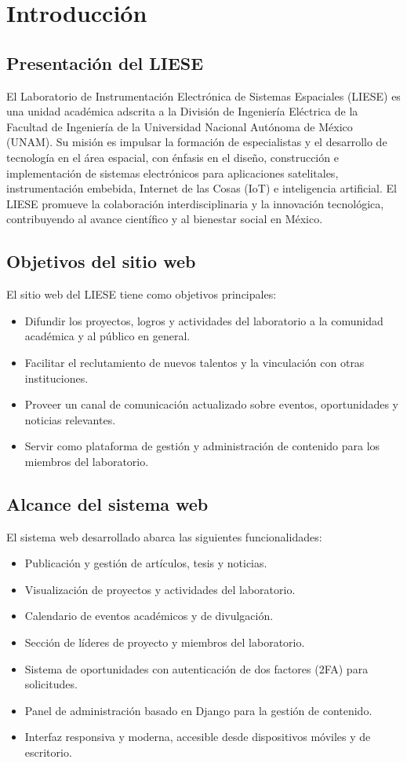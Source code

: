 \chapter{Introducción}

\section{Presentación del LIESE}
El Laboratorio de Instrumentación Electrónica de Sistemas Espaciales (LIESE) es una unidad académica adscrita a la División de Ingeniería Eléctrica de la Facultad de Ingeniería de la Universidad Nacional Autónoma de México (UNAM). Su misión es impulsar la formación de especialistas y el desarrollo de tecnología en el área espacial, con énfasis en el diseño, construcción e implementación de sistemas electrónicos para aplicaciones satelitales, instrumentación embebida, Internet de las Cosas (IoT) e inteligencia artificial. El LIESE promueve la colaboración interdisciplinaria y la innovación tecnológica, contribuyendo al avance científico y al bienestar social en México.

\section{Objetivos del sitio web}
El sitio web del LIESE tiene como objetivos principales:
\begin{itemize}
    \item Difundir los proyectos, logros y actividades del laboratorio a la comunidad académica y al público en general.
    \item Facilitar el reclutamiento de nuevos talentos y la vinculación con otras instituciones.
    \item Proveer un canal de comunicación actualizado sobre eventos, oportunidades y noticias relevantes.
    \item Servir como plataforma de gestión y administración de contenido para los miembros del laboratorio.
\end{itemize}

\section{Alcance del sistema web}
El sistema web desarrollado abarca las siguientes funcionalidades:
\begin{itemize}
    \item Publicación y gestión de artículos, tesis y noticias.
    \item Visualización de proyectos y actividades del laboratorio.
    \item Calendario de eventos académicos y de divulgación.
    \item Sección de líderes de proyecto y miembros del laboratorio.
    \item Sistema de oportunidades con autenticación de dos factores (2FA) para solicitudes.
    \item Panel de administración basado en Django para la gestión de contenido.
    \item Interfaz responsiva y moderna, accesible desde dispositivos móviles y de escritorio.
\end{itemize}

